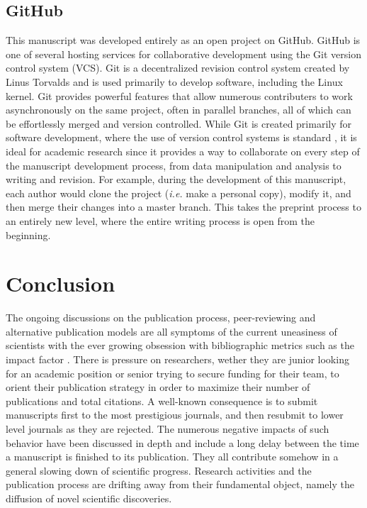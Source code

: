 \documentclass[letterpaper,twocolumn,superscriptaddress,showkeys,longbibliography]{revtex4-1}
\begin{document}
\subsection{GitHub}

This manuscript was developed entirely as an open project on GitHub. GitHub is
one of several hosting services for collaborative development using the Git
version control system (VCS).  Git is a decentralized revision control system
created by Linus Torvalds and is used primarily to develop software, including
the Linux kernel. Git provides powerful features that allow numerous
contributers to work asynchronously on the same project, often in parallel
branches, all of which can be effortlessly merged and version controlled.  While
Git is created primarily for software development, where the use of version
control systems is standard \cite{aru12}, it is ideal for academic research
since it provides a way to collaborate on every step of the manuscript
development process, from data manipulation and analysis to writing and
revision. For example, during the development of this manuscript, each author
would clone the project (\emph{i.e.} make a personal copy), modify it, and then
merge their changes into a master branch. This takes the preprint process to an
entirely new level, where the entire writing process is open from the beginning.

\section{Conclusion}

The ongoing discussions on the publication process, peer-reviewing and
alternative publication models are all symptoms of the current uneasiness of
scientists with the ever growing obsession with bibliographic metrics such as
the impact factor \cite{Fisher2012}. There is pressure on researchers, wether
they are junior looking for an academic position or senior trying to secure
funding for their team, to orient their publication strategy in order to
maximize their number of publications and total citations. A well-known
consequence is to submit manuscripts first to the most prestigious journals, and
then resubmit to lower level journals as they are rejected. The numerous
negative impacts of such behavior have been discussed in depth \cite{hoc09} and
include a long delay between the time a manuscript is finished to its
publication.  They all contribute somehow in a general slowing down of
scientific progress.  Research activities and the publication process are
drifting away from their fundamental object, namely the diffusion of novel
scientific discoveries. 
\end{document}
